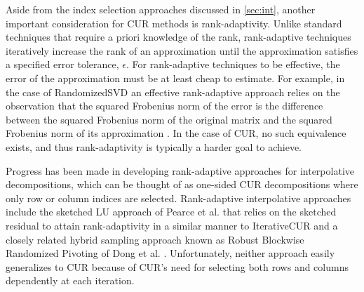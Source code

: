 Aside from the index selection approaches discussed in \cref{sec:int}, another important consideration for CUR methods is rank-adaptivity. Unlike standard techniques that require a priori knowledge of the rank, rank-adaptive techniques iteratively increase the rank of an approximation until the approximation satisfies a specified error tolerance, $\epsilon$. For rank-adaptive techniques to be effective, the error of the approximation must be at least cheap to estimate. For example, in the case of RandomizedSVD an effective rank-adaptive approach relies on the observation that the squared Frobenius norm of the error is the difference between the squared Frobenius norm of the original matrix and the squared Frobenius norm of its approximation \cite{yu2018efficient}. In the case of CUR, no such equivalence exists, and thus rank-adaptivity is typically a harder goal to achieve. 

Progress has been made in developing rank-adaptive approaches for interpolative decompositions, which can be thought of as one-sided CUR decompositions where only row or column indices are selected. Rank-adaptive interpolative approaches include the sketched LU approach of Pearce et al. \cite{pearce2025adaptive} that relies on the sketched residual to attain rank-adaptivity in a similar manner to IterativeCUR and a closely related hybrid sampling approach known as Robust Blockwise Randomized Pivoting of Dong et al. \cite{dong2024robust}. Unfortunately, neither approach easily generalizes to CUR because of CUR's need for selecting both rows and columns dependently at each iteration. %

